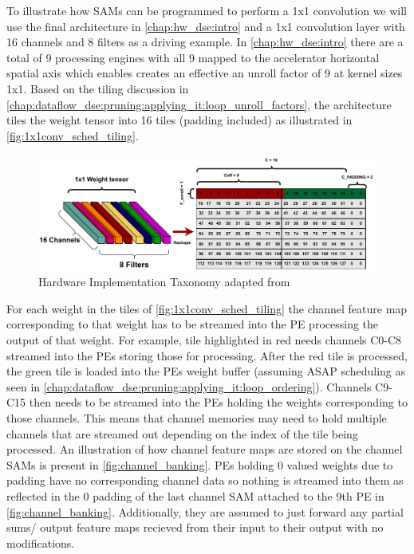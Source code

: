 To illustrate how SAMs can be programmed to perform a 1x1 convolution we will
use the final architecture in \autoref{chap:hw_dse:intro} and a 1x1 convolution
layer with 16 channels and 8 filters as a driving example. In
\autoref{chap:hw_dse:intro} there are a total of 9 processing engines with all 9
mapped to the accelerator horizontal spatial axis which enables creates an
effective an unroll factor of 9 at kernel sizes 1x1. Based on the tiling
discussion in
\autoref{chap:dataflow_dse:pruning:applying_it:loop_unroll_factors}, the
architecture tiles the weight tensor into 16 tiles (padding included) as
illustrated in \autoref{fig:1x1conv_sched_tiling}.

\begin{figure}[ht]
    \centering
    \includegraphics[scale=0.6]{fig/1x1conv_sched_tiling.pdf}
    \caption{Hardware Implementation Taxonomy adapted from \cite{maestro}}
    \label{fig:1x1conv_sched_tiling}
\end{figure}

For each weight in the tiles of \autoref{fig:1x1conv_sched_tiling} the channel
feature map corresponding to that weight has to be streamed into the PE
processing the output of that weight. For example, tile highlighted in red needs
channels C0-C8 streamed into the PEs storing those for processing. After the red
tile is processed, the green tile is loaded into the PEs weight buffer (assuming
ASAP scheduling as seen in
\autoref{chap:dataflow_dse:pruning:applying_it:loop_ordering}). Channels C9-C15
then needs to be streamed into the PEs holding the weights corresponding to
those channels. This means that channel memories may need to hold multiple
channels that are streamed out depending on the index of the tile being
processed. An illustration of how channel feature maps are stored on the channel
SAMs is present in \autoref{fig:channel_banking}. PEs holding 0 valued weights
due to padding have no corresponding channel data so nothing is streamed into
them as reflected in the 0 padding of the last channel SAM attached to the 9th
PE in \autoref{fig:channel_banking}. Additionally, they are assumed to just
forward any partial sums/ output feature maps recieved from their input to their
output with no modifications.

